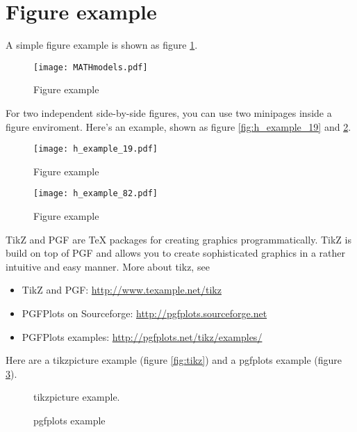 \section{Figure example}\label{sec:figure}

A simple figure example is shown as figure \ref{fig:mathmodels}.

\begin{figure}[!htb]
\centering
\texttt{[image: MATHmodels.pdf]}
\caption{Figure example}\label{fig:mathmodels}
\end{figure}

For two independent side-by-side figures, you can use two minipages inside a figure enviroment. Here's an example, shown as figure \ref{fig:h_example_19} and \ref{fig:h_example_82}.
\begin{figure}[!htb]
\begin{minipage}[t]{0.5\linewidth}
\centering
\texttt{[image: h\_example\_19.pdf]}
\caption{Figure example}\label{fig:h_example_19}
\end{minipage}
\begin{minipage}[t]{0.5\linewidth}
\centering
\texttt{[image: h\_example\_82.pdf]}
\caption{Figure example}\label{fig:h_example_82}
\end{minipage}
\end{figure}


TikZ and PGF are TeX packages for creating graphics programmatically. TikZ is build on top of PGF and allows you to create sophisticated graphics in a rather intuitive and easy manner. More about tikz, see 
\begin{itemize}
\item TikZ and PGF:  \url{http://www.texample.net/tikz}
\item PGFPlots on Sourceforge:  \url{http://pgfplots.sourceforge.net}
\item PGFPlots examples:  \url{http://pgfplots.net/tikz/examples/}
\end{itemize}
Here are a tikzpicture example (figure \ref{fig:tikz}) and a pgfplots example (figure \ref{fig:pgfplots}).
\begin{figure}[!htb]
\begin{minipage}[t]{0.5\linewidth}
\centering

\caption{tikzpicture example. }\label{fig:tikz}
\end{minipage}
\begin{minipage}[t]{0.5\linewidth}
\centering
\centering

\caption{pgfplots example}\label{fig:pgfplots}
\end{minipage}
\end{figure}
